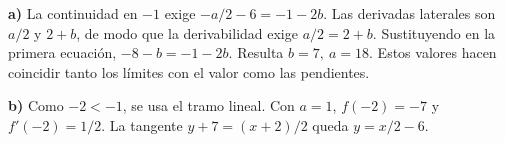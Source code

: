 \textbf{a)} La continuidad en $-1$ exige
$-a/2-6=-1-2b$. Las derivadas laterales son $a/2$ y
$2+b$, de modo que la derivabilidad exige $a/2=2+b$.
Sustituyendo en la primera ecuación, $-8-b=-1-2b$.
Resulta $\boxed{b=7,\ a=18}$. Estos valores hacen coincidir
tanto los límites con el valor como las pendientes.

\textbf{b)} Como $-2<-1$, se usa el tramo lineal.
Con $a=1$, $f(-2)=-7$ y $f'(-2)=1/2$.
La tangente $y+7=(x+2)/2$ queda $\boxed{y=x/2-6}$.
